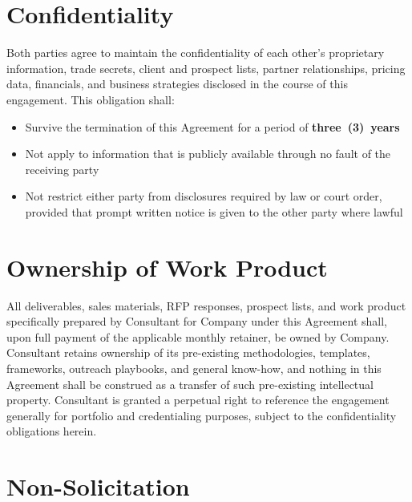 \documentclass{toospoint}
\begin{document}
\section{Confidentiality}

Both parties agree to maintain the confidentiality of each other's proprietary
information, trade secrets, client and prospect lists, partner relationships,
pricing data, financials, and business strategies disclosed in the course of
this engagement. This obligation shall:

\begin{itemize}[leftmargin=1.5em, itemsep=4pt, topsep=4pt]
  \item Survive the termination of this Agreement for a period of \textbf{three~(3)~years}
  \item Not apply to information that is publicly available through no fault of the receiving party
  \item Not restrict either party from disclosures required by law or court order, provided that prompt written notice is given to the other party where lawful
\end{itemize}

\section{Ownership of Work Product}

All deliverables, sales materials, RFP responses, prospect lists, and work
product specifically prepared by Consultant for Company under this Agreement
shall, upon full payment of the applicable monthly retainer, be owned by
Company. Consultant retains ownership of its pre-existing methodologies,
templates, frameworks, outreach playbooks, and general know-how, and nothing
in this Agreement shall be construed as a transfer of such pre-existing
intellectual property. Consultant is granted a perpetual right to reference
the engagement generally for portfolio and credentialing purposes, subject to
the confidentiality obligations herein.

\section{Non-Solicitation}
\end{document}
